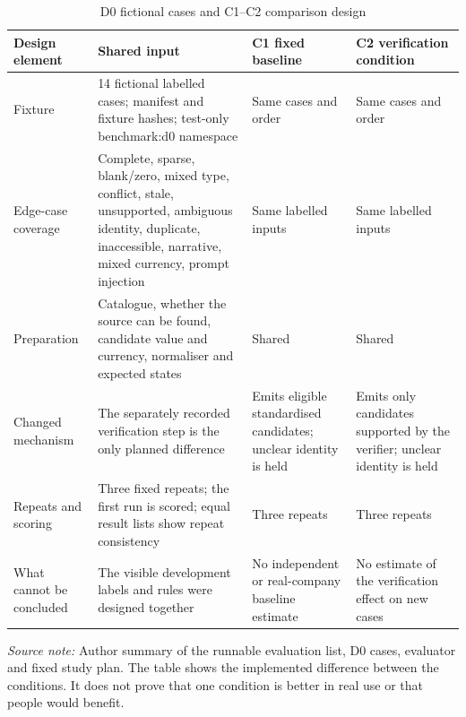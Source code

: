 \clearpage
\begin{table}[p]
  \centering
  \scriptsize
  \setlength{\tabcolsep}{3pt}
  \renewcommand{\arraystretch}{1.08}
  \begin{tabularx}{\textwidth}{@{}P{0.19\textwidth}P{0.26\textwidth}P{0.24\textwidth}Y@{}}
    \toprule
    \textbf{Design element} & \textbf{Shared input} & \textbf{C1 fixed baseline} & \textbf{C2 verification condition} \\
    \midrule
    Fixture & 14 fictional labelled cases; manifest and fixture hashes; test-only \textnormal{benchmark:d0} namespace & Same cases and order & Same cases and order \\
    \addlinespace
    Edge-case coverage & Complete, sparse, blank/zero, mixed type, conflict, stale, unsupported, ambiguous identity, duplicate, inaccessible, narrative, mixed currency, prompt injection & Same labelled inputs & Same labelled inputs \\
    \addlinespace
    Preparation & Catalogue, whether the source can be found, candidate value and currency, normaliser and expected states & Shared & Shared \\
    \addlinespace
    Changed mechanism & The separately recorded verification step is the only planned difference & Emits eligible standardised candidates; unclear identity is held & Emits only candidates supported by the verifier; unclear identity is held \\
    \addlinespace
    Repeats and scoring & Three fixed repeats; the first run is scored; equal result lists show repeat consistency & Three repeats & Three repeats \\
    \addlinespace
    What cannot be concluded & The visible development labels and rules were designed together & No independent or real-company baseline estimate & No estimate of the verification effect on new cases \\
    \bottomrule
  \end{tabularx}

  \caption{D0 fictional cases and C1--C2 comparison design}
  \label{tab:eval-d0-comparison-design}

  \vspace{4pt}
  \parbox{\textwidth}{\scriptsize
    \textit{Source note:} Author summary of the runnable evaluation list, D0 cases, evaluator and
    fixed study plan. The table shows the implemented difference between the conditions. It does not
    prove that one condition is better in real use or that people would benefit.}
\end{table}
\clearpage
